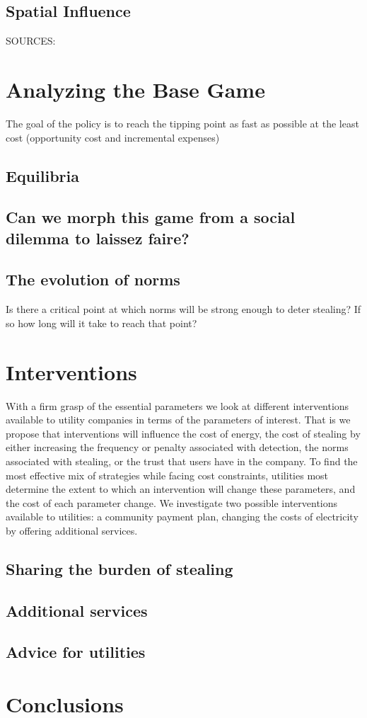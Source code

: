 \documentclass{article}
\begin{document}
\subsection{Spatial Influence}  
SOURCES:
\section{Analyzing the Base Game}                                                                                                  
The goal of the policy is to reach the tipping point as fast as possible at the least cost (opportunity cost and incremental expenses) 

\subsection{Equilibria}

\subsection{Can we morph this game from a social dilemma to laissez faire?}

\subsection{The evolution of norms}
Is there a critical point at which norms will be strong enough to deter stealing? If so how long will it take to reach that point? 

\section{Interventions}
With a firm grasp of the essential parameters we look at different interventions available to utility companies in terms of the parameters of interest. That is we propose that interventions will influence the cost of energy, the cost of stealing by either increasing the frequency or penalty associated with detection, the norms associated with stealing, or the trust that users have in the company. To find the most effective mix of strategies while facing cost constraints, utilities most determine the extent to which an intervention will change these parameters, and the cost of each parameter change. We investigate two possible interventions available to utilities: a community payment plan, changing the costs of electricity by offering additional services. 

\listoftodos

\subsection{Sharing the burden of stealing}

\subsection{Additional services}

\subsection{Advice for utilities}

\section{Conclusions}
\end{document}

